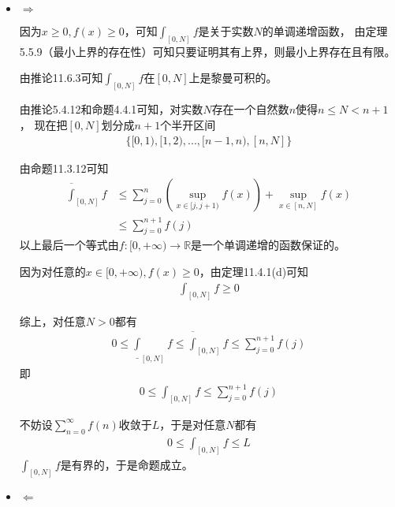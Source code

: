 \documentclass{article}
\begin{document}
\begin{itemize}
  \item $\Rightarrow$

        因为$x \geq 0, f(x) \geq 0$，可知$\int_{[0, N]} f$是关于实数$N$的单调递增函数，
        由定理5.5.9（最小上界的存在性）可知只要证明其有上界，则最小上界存在且有限。

        由推论11.6.3可知$\int_{[0, N]} f$在$[0, N]$上是黎曼可积的。

        由推论5.4.12和命题4.4.1可知，对实数$N$存在一个自然数$n$使得$n \leq N < n + 1$，
        现在把$[0, N]$划分成$n+1$个半开区间
        \begin{align*}
          \{[0, 1), [1, 2),...,[n-1, n), [n, N]\}
        \end{align*}

        由命题11.3.12可知
        \begin{align*}
          \overline{\int}_{[0, N]} f & \leq \sum\limits_{j=0}^{n} \left( \sup\limits_{x \in [j, j+1)} f(x)  \right)
          + \sup\limits_{x \in [n, N]} f(x)                                                                         \\
                                     & \leq \sum\limits_{j=0}^{n + 1} f(j)
        \end{align*}
        以上最后一个等式由$f: [0, +\infty) \to \mathbb{R}$是一个单调递增的函数保证的。

        因为对任意的$x \in [0, +\infty), f(x) \geq 0$，由定理11.4.1(d)可知
        \begin{align*}
          \int_{[0, N]} f  \geq 0
        \end{align*}


        综上，对任意$N > 0$都有
        \begin{align*}
          0 \leq \underline{\int}_{[0, N]} f \leq \overline{\int}_{[0, N]} f \leq \sum\limits_{j=0}^{n + 1} f(j)
        \end{align*}
        即
        \begin{align*}
          0 \leq \int_{[0, N]} f \leq \sum\limits_{j=0}^{n + 1} f(j)
        \end{align*}

        不妨设$\sum\limits_{n = 0}^\infty f(n)$收敛于$L$，于是对任意$N$都有
        \begin{align*}
          0 \leq \int_{[0, N]} f \leq  L
        \end{align*}
        $\int_{[0, N]} f$是有界的，于是命题成立。

  \item $\Leftarrow$


\end{itemize}
\end{document}
